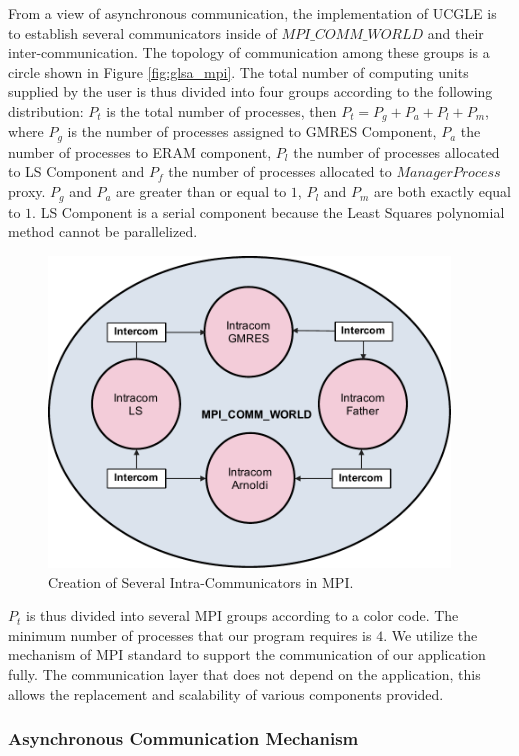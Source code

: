 From a view of asynchronous communication, the implementation of UCGLE is to establish several communicators inside of $MPI\_COMM\_WORLD$ and their inter-communication. The topology of communication among these groups is a circle shown in Figure \ref{fig:glsa_mpi}. The total number of computing units supplied by the user is thus divided into four groups according to the following distribution: $P_t$ is the total number of processes, then $P_t = P_g + P_a + P_l + P_m$, where $P_g$ is the number of processes assigned to GMRES Component, $P_a$ the number of processes to ERAM component, $P_l$ the number of processes allocated to LS Component and $P_f$ the number of processes allocated to $Manager Process$ proxy. $P_g$ and $P_a$ are greater than or equal to $1$, $P_l$ and $P_m$ are both exactly equal to $1$. LS Component is a serial component because the Least Squares polynomial method cannot be parallelized.

\begin{figure}
	\centering
	\includegraphics[width=4.2in]{fig/UCGLE_COMM_WORLD.pdf}
	\caption{Creation of Several Intra-Communicators in MPI.}
	\label{fig:ucgle_comm_world}
\end{figure}


$P_t$ is thus divided into several MPI groups according to a color code. The minimum number of processes that our program requires is $4$. We utilize the mechanism of MPI standard to support the communication of our application fully. The communication layer that does not depend on the application, this allows the replacement and scalability of various components provided.

\subsubsection{Asynchronous Communication Mechanism}

